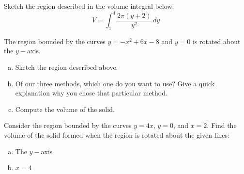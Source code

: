 \documentclass[notes]{subfiles}
\begin{document}
		\begin{ex}
			Sketch the region described in the volume integral below:
				\[V = \int_1^4 \dfrac{2\pi (y+2)}{y^2}\, dy\]
		\end{ex}
			\newpage

		\begin{ex}
			The region bounded by the curves $y = -x^2 + 6x-8$ and $y = 0$ is rotated about the $y-$axis.
				\begin{enumerate}[(a)]
					\item Sketch the region described above.
						
					\item Of our three methods, which one do you want to use?  Give a quick explanation why you chose that particular method.
						
					\item Compute the volume of the solid.
				\end{enumerate}
		\end{ex}
			\newpage
			
		\begin{ex}	
			Consider the region bounded by the curves $y = 4x$, $y = 0$, and $x = 2$.  Find the volume of the solid formed when the region is rotated about the given lines:
			\begin{enumerate}[(a)]
				\item The $y-$axis
					\vs{1}
					
				\item $x = 4$
					\vs{1}
			\end{enumerate}
		\end{ex}
				
	\clearpage
\end{document}
